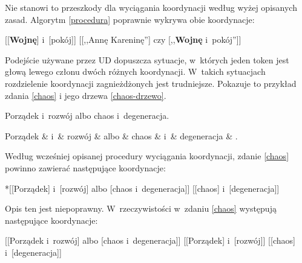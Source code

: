 Nie stanowi to przeszkody dla wyciągania koordynacji według wyżej opisanych zasad. Algorytm \eqref{procedura} poprawnie wykrywa obie koordynacje:

\begin{exe}
\ex \label{wojna+pokój-1} 
{[[\textbf{Wojnę}] i~[pokój]]}
\ex \label{wojna+pokój-2} 
{[[,,Annę Kareninę''] czy [,,\textbf{Wojnę} i~pokój'']]}
\end{exe}

Podejście używane przez UD dopuszcza sytuacje, w~których jeden token jest głową lewego członu dwóch różnych koordynacji. W~takich sytuacjach rozdzielenie koordynacji zagnieżdżonych jest trudniejsze. Pokazuje to przykład zdania \eqref{chaos} i jego drzewa \eqref{chaos-drzewo}.

\begin{exe}
\ex \label{chaos}
Porządek i~rozwój albo chaos i~degeneracja.
\ex \label{chaos-drzewo}
\begin{dependency}[baseline=-\the\dimexpr\fontdimen22\textfont2\relax]
\begin{deptext}[column sep=1em]
Porządek \& i~\& rozwój \& albo \& chaos \& i~\& degeneracja \& .  \\ 
\end{deptext}
\end{dependency}
\end{exe}

Według wcześniej opisanej procedury wyciągania koordynacji, zdanie \eqref{chaos} powinno zawierać następujące koordynacje:

\begin{exe}
\ex \label{chaos-źle-1}
{*[[Porządek] i~[rozwój] albo [chaos i~degeneracja]]}
\ex \label{chaos-źle-2}
{[[chaos] i~[degeneracja]]}
\end{exe}

Opis ten jest niepoprawny. W~rzeczywistości  w~zdaniu \eqref{chaos} występują następujące koordynacje:

\begin{exe}
\ex \label{chaos-1}
{[[Porządek i~rozwój] albo [chaos i~degeneracja]]}
\ex \label{chaos-2}
{[[Porządek] i~[rozwój]]}
\ex \label{chaos-3}
{[[chaos] i~[degeneracja]]}
\end{exe}


